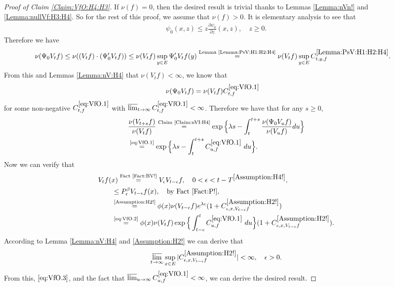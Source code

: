 \documentclass[12pt,a4paper]{amsart}
\numberwithin{equation}{section}
\theoremstyle{plain}
\theoremstyle{definition}
\theoremstyle{remark}
\newcounter{N}
\newcounter{n}[N]
\begin{document}
\begin{proof}[{Proof of Claim \ref{Claim:VfO:H4:H3}}]
If $\nu(f) = 0$, then the desired result is trivial thanks to Lemmas \ref{Lemma:nVn!} and \ref{Lemma:nullVf:H3:H4}.
So for the rest of this proof, we assume that $\nu(f)>0$. 
It is elementary analysis to see that 
\begin{align}
  \psi_0(x,z) 
  \leq z \frac{\partial \psi_0}{\partial z}(x,z),
  \quad z\geq 0.
  \end{align}
Therefore we have 
\begin{align}
  &\nu(\Psi_0 V_tf) 
\leq \nu((V_tf)\cdot (\Psi_0' V_tf)) \leq \nu(V_tf) \sup_{y\in E} \Psi_0' V_tf(y)
\overset{\text{Lemma \ref{Lemma:PsV:H1:H2:H4}}}= \nu(V_tf) \sup_{y\in E} C^{\ref{Lemma:PsV:H1:H2:H4}}_{t,y,f}.
  \end{align}
 From this and Lemmas \ref{Lemma:nV:H4} that $\nu(V_tf) <\infty$, we know that
 \begin{align} \label{eq:VfO.1}
 	& \nu(\Psi_0 V_t f)  = \nu(V_tf) C^{\eqref{eq:VfO.1}}_{t,f} 
 \end{align}
 for some non-negative $C^{\eqref{eq:VfO.1}}_{t,f} $ with $\varlimsup_{t\to \infty} C^{\eqref{eq:VfO.1}}_{t,f}  < \infty$.
Therefore we have that for any $s\geq 0$, 
\begin{align} 
&  \frac{\nu(V_{t+s} f)} {\nu(V_t f)} \overset{\text{Claim \ref{Claim:nVI:H4}}}= \exp\Big\{ \lambda s - \int_t^{t+s} \frac{\nu(\Psi_0 V_u f) }{\nu(V_u f)} du\Big\} 
\\&\label{eq:VfO.2} \overset{\text{\eqref{eq:VfO.1}}}= \exp\Big\{ \lambda s - \int_t^{t+s} C^{\eqref{eq:VfO.1}}_{u,f} ~du\Big\}. \end{align} 
Now we can verify that
\begin{align}
 \MoveEqLeft V_{t}f(x) \overset{\text{Fact \ref{Fact:BV!}}}= V_{\epsilon} V_{t-\epsilon} f , \quad 0<\epsilon < t- T^{\ref{Assumption:H4!}} , 
 \\&\leq P_\epsilon^\beta V_{t-\epsilon} f(x),\quad\text{by Fact \ref{Fact:P!}},
  \\& \overset{\text{\ref{Assumption:H2!}}}= \phi(x) \nu(V_{t-\epsilon}f) e^{\lambda  \epsilon} (1+C_{\epsilon,x, V_{t-\epsilon} f}^{\ref{Assumption:H2!}} )
\\& \label{eq:VfO.3}\overset{\text{\eqref{eq:VfO.2}}}= \phi(x)\nu(V_{t}f)\exp\Big\{ \int_{t-\epsilon}^t C^{\eqref{eq:VfO.1}}_{u,f} ~du\Big\} (1+C_{\epsilon,x, V_{t-\epsilon} f}^{\ref{Assumption:H2!}} ).
  \end{align}
According to Lemma \ref{Lemma:nV:H4}  and \ref{Assumption:H2!} we can derive that 
\[\varlimsup_{t\to \infty}\sup_{x\in E} |C_{\epsilon,x, V_{t-\epsilon} f}^{\ref{Assumption:H2!}}| < \infty, \quad \epsilon > 0.\]
From this, $\eqref{eq:VfO.3}$, and the fact that $\varlimsup_{u\to \infty} C^{\eqref{eq:VfO.1}}_{u,f}  < \infty$, we can derive the desired result.
\end{proof}
\end{document}
